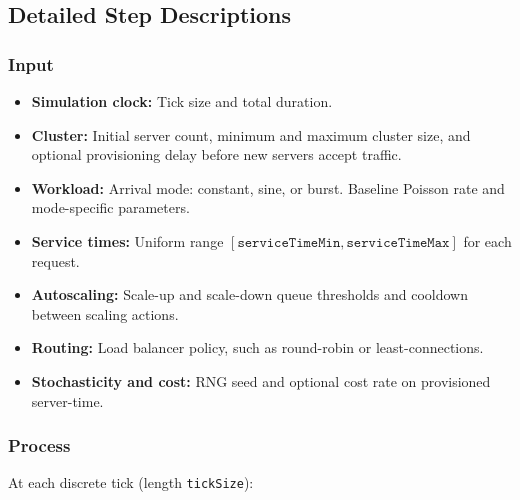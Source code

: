 \documentclass[12pt, a4paper]{article}
\newcommand{\code}[1]{\texttt{\textcolor{NUNavyL}{#1}}}
\begin{document}
\subsection{Detailed Step Descriptions}

\subsubsection{Input}
\begin{itemize}[label=\textcolor{IPOBlue}{$\rightarrow$}]
  \item \textbf{Simulation clock:} Tick size and total duration.
  \item \textbf{Cluster:} Initial server count, minimum and maximum cluster size,
    and optional provisioning delay before new servers accept traffic.
  \item \textbf{Workload:} Arrival mode: constant, sine, or burst. Baseline
    Poisson rate and mode-specific parameters.
  \item \textbf{Service times:} Uniform range
    $[\texttt{serviceTimeMin},\texttt{serviceTimeMax}]$ for each request.
  \item \textbf{Autoscaling:} Scale-up and scale-down queue thresholds and
    cooldown between scaling actions.
  \item \textbf{Routing:} Load balancer policy, such as round-robin or
    least-connections.
  \item \textbf{Stochasticity and cost:} RNG seed and optional cost rate on
    provisioned server-time.
\end{itemize}

\subsubsection{Process}

At each discrete tick (length \code{tickSize}):
\end{document}
